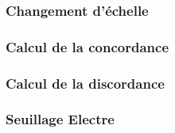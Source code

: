 \documentclass[12pt]{article}
\begin{document}
\subsubsection{Changement d'échelle}

\subsubsection{Calcul de la concordance}

\subsubsection{Calcul de la discordance}

\subsubsection{Seuillage Electre}

\end{document}

